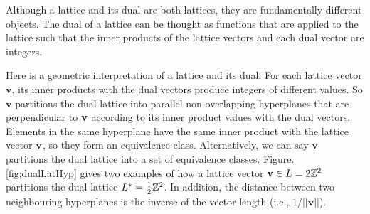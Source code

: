 \documentclass[../main.tex]{subfiles}
\begin{document}
Although a lattice and its dual are both lattices, they are fundamentally different objects. The dual of a lattice can be thought as functions that are applied to the lattice such that the inner products of the lattice vectors and each dual vector are integers. 

Here is a geometric interpretation of a lattice and its dual. For each lattice vector $\mathbf{v}$, its inner products with the dual vectors produce integers of different values. So $\mathbf{v}$ partitions the dual lattice into parallel non-overlapping hyperplanes that are perpendicular to $\mathbf{v}$
\reversemarginpar
{}
according to its inner product values with the dual vectors. Elements in the same hyperplane have the same inner product with the lattice vector $\mathbf{v}$, so they form an equivalence class. Alternatively, we can say $\mathbf{v}$ partitions the dual lattice into a set of equivalence classes. Figure. \ref{fig:dualLatHyp} gives two examples of how a lattice vector $\mathbf{v}\in L=2\mathbb{Z}^2$ partitions the dual lattice $L^*=\frac{1}{2}\mathbb{Z}^2$. In addition, the distance between two neighbouring hyperplanes is the inverse of the vector length (i.e., $1/||\mathbf{v}||$).
\end{document}
